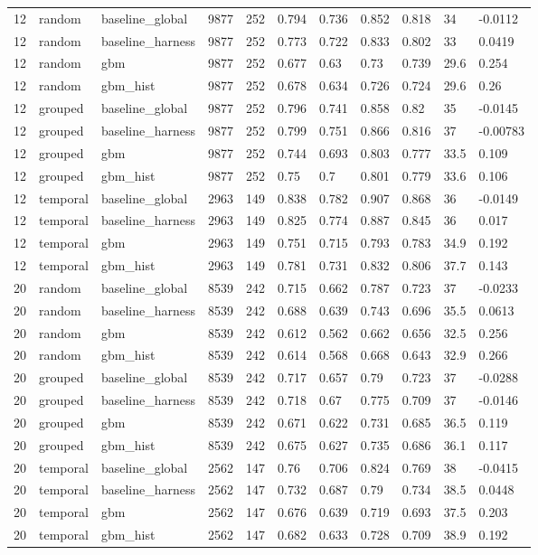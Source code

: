 \begin{tabular}{lllllllllll}
12 & random & baseline\_global & 9877 & 252 & 0.794 & 0.736 & 0.852 & 0.818 & 34 & -0.0112 \\
12 & random & baseline\_harness & 9877 & 252 & 0.773 & 0.722 & 0.833 & 0.802 & 33 & 0.0419 \\
12 & random & gbm & 9877 & 252 & 0.677 & 0.63 & 0.73 & 0.739 & 29.6 & 0.254 \\
12 & random & gbm\_hist & 9877 & 252 & 0.678 & 0.634 & 0.726 & 0.724 & 29.6 & 0.26 \\
12 & grouped & baseline\_global & 9877 & 252 & 0.796 & 0.741 & 0.858 & 0.82 & 35 & -0.0145 \\
12 & grouped & baseline\_harness & 9877 & 252 & 0.799 & 0.751 & 0.866 & 0.816 & 37 & -0.00783 \\
12 & grouped & gbm & 9877 & 252 & 0.744 & 0.693 & 0.803 & 0.777 & 33.5 & 0.109 \\
12 & grouped & gbm\_hist & 9877 & 252 & 0.75 & 0.7 & 0.801 & 0.779 & 33.6 & 0.106 \\
12 & temporal & baseline\_global & 2963 & 149 & 0.838 & 0.782 & 0.907 & 0.868 & 36 & -0.0149 \\
12 & temporal & baseline\_harness & 2963 & 149 & 0.825 & 0.774 & 0.887 & 0.845 & 36 & 0.017 \\
12 & temporal & gbm & 2963 & 149 & 0.751 & 0.715 & 0.793 & 0.783 & 34.9 & 0.192 \\
12 & temporal & gbm\_hist & 2963 & 149 & 0.781 & 0.731 & 0.832 & 0.806 & 37.7 & 0.143 \\
20 & random & baseline\_global & 8539 & 242 & 0.715 & 0.662 & 0.787 & 0.723 & 37 & -0.0233 \\
20 & random & baseline\_harness & 8539 & 242 & 0.688 & 0.639 & 0.743 & 0.696 & 35.5 & 0.0613 \\
20 & random & gbm & 8539 & 242 & 0.612 & 0.562 & 0.662 & 0.656 & 32.5 & 0.256 \\
20 & random & gbm\_hist & 8539 & 242 & 0.614 & 0.568 & 0.668 & 0.643 & 32.9 & 0.266 \\
20 & grouped & baseline\_global & 8539 & 242 & 0.717 & 0.657 & 0.79 & 0.723 & 37 & -0.0288 \\
20 & grouped & baseline\_harness & 8539 & 242 & 0.718 & 0.67 & 0.775 & 0.709 & 37 & -0.0146 \\
20 & grouped & gbm & 8539 & 242 & 0.671 & 0.622 & 0.731 & 0.685 & 36.5 & 0.119 \\
20 & grouped & gbm\_hist & 8539 & 242 & 0.675 & 0.627 & 0.735 & 0.686 & 36.1 & 0.117 \\
20 & temporal & baseline\_global & 2562 & 147 & 0.76 & 0.706 & 0.824 & 0.769 & 38 & -0.0415 \\
20 & temporal & baseline\_harness & 2562 & 147 & 0.732 & 0.687 & 0.79 & 0.734 & 38.5 & 0.0448 \\
20 & temporal & gbm & 2562 & 147 & 0.676 & 0.639 & 0.719 & 0.693 & 37.5 & 0.203 \\
20 & temporal & gbm\_hist & 2562 & 147 & 0.682 & 0.633 & 0.728 & 0.709 & 38.9 & 0.192 \\
\bottomrule
\end{tabular}